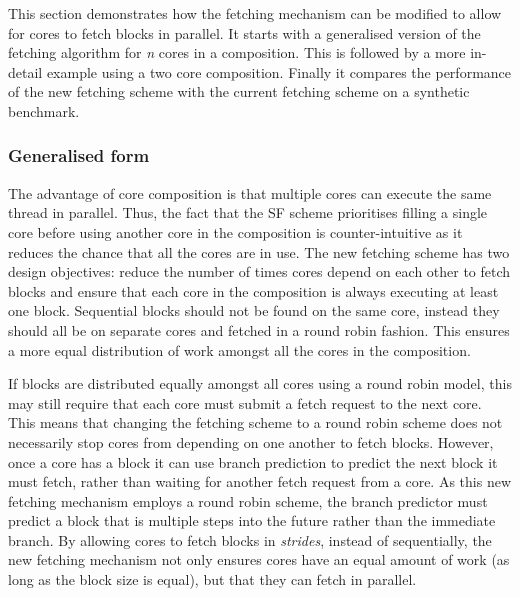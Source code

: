 This section demonstrates how the fetching mechanism can be modified to allow for cores to fetch blocks in parallel.
It starts with a generalised version of the fetching algorithm for \textit{n} cores in a composition.
This is followed by a more in-detail example using a two core composition.
Finally it compares the performance of the new fetching scheme with the current fetching scheme on a synthetic benchmark.

\subsubsection{Generalised form}
The advantage of core composition is that multiple cores can execute the same thread in parallel.
Thus, the fact that the SF scheme prioritises filling a single core before using another core in the composition is counter-intuitive as it reduces the chance that all the cores are in use.
The new fetching scheme has two design objectives: reduce the number of times cores depend on each other to fetch blocks and ensure that each core in the composition is always executing at least one block.
Sequential blocks should not be found on the same core, instead they should all be on separate cores and fetched in a round robin fashion.
This ensures a more equal distribution of work amongst all the cores in the composition.

If blocks are distributed equally amongst all cores using a round robin model, this may still require that each core must submit a fetch request to the next core.
This means that changing the fetching scheme to a round robin scheme does not necessarily stop cores from depending on one another to fetch blocks.
However, once a core has a block it can use branch prediction to predict the next block it must fetch, rather than waiting for another fetch request from a core.
As this new fetching mechanism employs a round robin scheme, the branch predictor must predict a block that is multiple steps into the future rather than the immediate branch.
By allowing cores to fetch blocks in \textit{strides}, instead of sequentially, the new fetching mechanism not only ensures cores have an equal amount of work (as long as the block size is equal), but that they can fetch in parallel.

